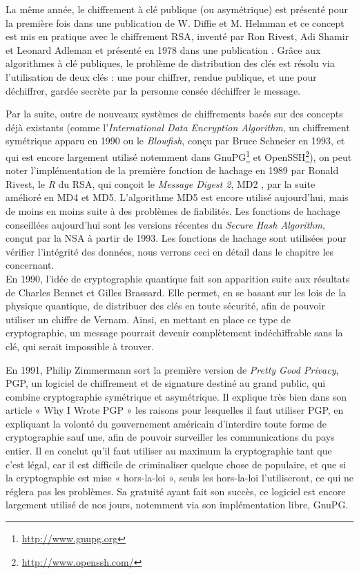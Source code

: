 La même année, le chiffrement à clé publique (ou asymétrique) est
présenté pour la première fois dans une publication de W. Diffie et
M. Helmman \cite{NewDirectionsInCryptography} et ce concept est mis en
pratique avec le chiffrement RSA, inventé par Ron Rivest, Adi Shamir
et Leonard Adleman et présenté en 1978 dans une publication 
\cite{RSAPaper}. Grâce aux algorithmes à clé publiques, le problème de
distribution des clés est résolu via l'utilisation de deux clés : une
pour chiffrer, rendue publique, et une pour déchiffrer, gardée secrète
par la personne censée déchiffrer le message.

Par la suite, outre de nouveaux systèmes de chiffrements basés sur des
concepts déjà existants (comme l'\emph{International Data Encryption
  Algorithm}, un chiffrement symétrique apparu en 1990 ou le
\emph{Blowfish}, conçu par Bruce Schneier en 1993, et qui est encore
largement utilisé notemment dans
GnuPG\footnote{\url{http://www.gnupg.org}} et
OpenSSH\footnote{\url{http://www.openssh.com/}}), on peut noter
l'implémentation de la première fonction de hachage en 1989 par Ronald
Rivest, le \emph{R} du RSA, qui conçoit le \emph{Message Digest 2},
MD2 , par la suite amélioré en MD4 et MD5. L'algorithme MD5 est encore
utilisé aujourd'hui, mais de moins en moins suite à des problèmes de
fiabilités. Les fonctions de hachage conseillées aujourd'hui sont les
versions récentes du \emph{Secure Hash Algorithm}, conçut par la NSA à
partir de 1993. Les fonctions de hachage sont utilisées pour vérifier
l'intégrité des données, nous verrons ceci en détail dans le chapitre
les concernant. %
\\

En 1990, l'idée de cryptographie quantique fait son apparition suite
aux résultats de Charles Bennet et Gilles Brassard. Elle permet, en se
basant sur les lois de la physique quantique, de distribuer des clés
en toute sécurité, afin de pouvoir utiliser un chiffre de
Vernam. Ainsi, en mettant en place ce type de cryptographie, un
message pourrait devenir complètement indéchiffrable sans la clé, qui
serait impossible à trouver.

En 1991, Philip Zimmermann sort la première version de \emph{Pretty Good
  Privacy}, PGP, un logiciel de chiffrement et de signature destiné au
grand public, qui combine cryptographie symétrique et asymétrique. Il
explique très bien dans son article « Why I Wrote PGP
»\cite{WhyIWrotePGP} les raisons pour lesquelles il faut utiliser PGP,
en expliquant la volonté du gouvernement américain d'interdire toute
forme de cryptographie sauf une, afin de pouvoir surveiller les
communications du pays entier. Il en conclut qu'il faut utiliser au
maximum la cryptographie tant que c'est légal, car il est difficile de
criminaliser quelque chose de populaire, et que si la cryptographie
est mise « hors-la-loi », seuls les hors-la-loi l'utiliseront, ce qui
ne réglera pas les problèmes. Sa gratuité ayant fait son succès, ce
logiciel est encore largement
utilisé de nos jours, notemment via son implémentation libre, GnuPG. \\

